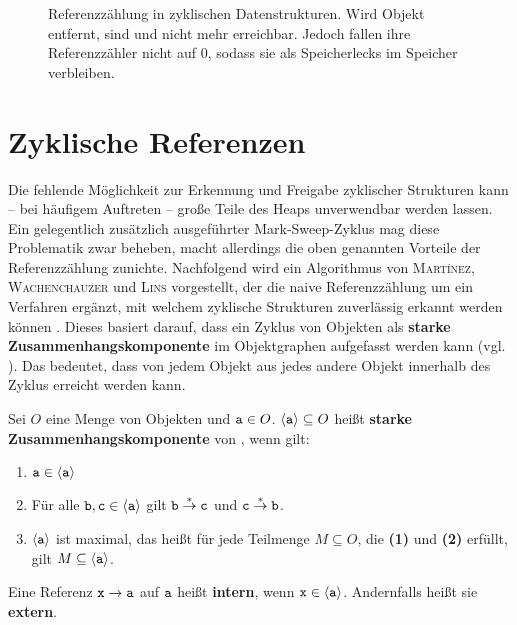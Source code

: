 \begin{figure}[h]
	\centering
	
	\caption[Referenzzählung in zyklischen Datenstrukturen]{Referenzzählung in zyklischen Datenstrukturen. Wird Objekt  entfernt, sind  und  nicht mehr erreichbar. Jedoch fallen ihre Referenzzähler nicht auf $0$, sodass sie als Speicherlecks im Speicher verbleiben.}
	\label{fig:rc-cycle}
\end{figure}




\section{Zyklische Referenzen}
\label{sec:cyclic-rc}
Die fehlende Möglichkeit zur Erkennung und Freigabe zyklischer Strukturen kann -- bei häufigem Auftreten -- große Teile des Heaps unverwendbar werden lassen.
Ein gelegentlich zusätzlich ausgeführter Mark-Sweep-Zyklus mag diese Problematik zwar beheben, macht allerdings die oben genannten Vorteile der Referenzzählung zunichte.
Nachfolgend wird ein Algorithmus von \textsc{Martínez}, \textsc{Wachenchauzer} und \textsc{Lins} vorgestellt, der die naive Referenzzählung um ein Verfahren ergänzt, mit welchem zyklische Strukturen zuverlässig erkannt werden können \cite{martinez1990}.
Dieses basiert darauf, dass ein Zyklus von Objekten als \textbf{starke Zusammenhangskomponente} im Objektgraphen aufgefasst werden kann (vgl. \cite[S. 348]{linhou2006}).
Das bedeutet, dass von jedem Objekt aus jedes andere Objekt innerhalb des Zyklus erreicht werden kann.

\newpage

\begin{mybox}
\begin{defn}
\label{def:zusammenhang}
	Sei $O$ eine Menge von Objekten und $\texttt{a} \in O$.
	$\left\langle\texttt{a}\right\rangle \subseteq O$ heißt \textbf{starke Zusammenhangskomponente} von , wenn gilt:
	\begin{enumerate}[(1)]
		\item $\texttt{a} \in \left\langle\texttt{a}\right\rangle$
		\item Für alle $\texttt{b}, \texttt{c} \in \left\langle\texttt{a}\right\rangle$ gilt $\texttt{b} \overset{*}{\rightarrow} \texttt{c}$ und $\texttt{c} \overset{*}{\rightarrow} \texttt{b}$.
		\item $\left\langle\texttt{a}\right\rangle$ ist maximal, das heißt für jede Teilmenge $M \subseteq O$, die \textbf{(1)} und \textbf{(2)} erfüllt, gilt $M \subseteq \left\langle\texttt{a}\right\rangle$.
	\end{enumerate}
	Eine Referenz $\texttt{x} \rightarrow \texttt{a}$ auf $\texttt{a}$ heißt \textbf{intern}, wenn $\texttt{x} \in \left\langle\texttt{a}\right\rangle$.
	Andernfalls heißt sie \textbf{extern}.	
\end{defn}
\end{mybox}

